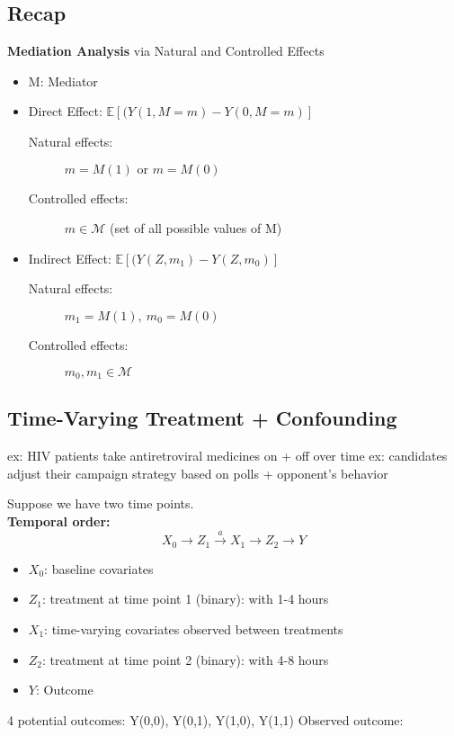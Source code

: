 \subsection*{Recap}
\textbf{Mediation Analysis} via Natural and Controlled Effects
\begin{itemize}
    \item M: Mediator
    \item Direct Effect: $\mathbb{E}[(Y(1, M=m) - Y(0,M=m)]$
    \begin{description}
        \item[Natural effects:] $m = M(1) \text{ or } m = M(0)$
        \item[Controlled effects:] $m \in \mathcal{M}$ (set of all possible values of M)
    \end{description}
    \item Indirect Effect: $\mathbb{E}[(Y(Z, m_1) - Y(Z,m_0)]$
    \begin{description}
        \item[Natural effects:] $m_1 = M(1),~ m_0 = M(0)$
        \item[Controlled effects:] $m_0, m_1 \in \mathcal{M}$
    \end{description}
\end{itemize}

\subsection*{Time-Varying Treatment + Confounding}
ex: HIV patients take antiretroviral medicines on + off over time
ex: candidates adjust their campaign strategy based on polls + opponent's behavior

Suppose we have two time points.\\

\textbf{Temporal order:}
\[
X_0 \to Z_1 \overset{a}{\to} X_1 \to Z_2 \to Y
\]
\begin{itemize}
    \item $X_0$: baseline covariates
    \item $Z_1$: treatment at time point 1 (binary): with 1-4 hours
    \item $X_1$: time-varying covariates observed between treatments
    \item $Z_2$: treatment at time point 2 (binary): with 4-8 hours
    \item $Y$: Outcome
\end{itemize}
4 potential outcomes: Y(0,0), Y(0,1), Y(1,0), Y(1,1)
Observed outcome: 

